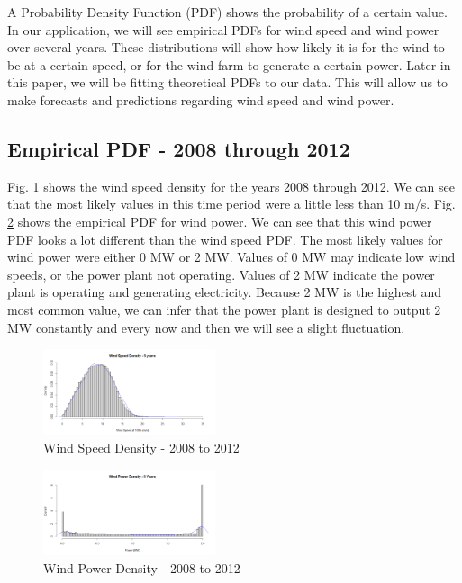 \documentclass{IEEEtran}
\begin{document}
  A Probability Density Function (PDF) shows the probability of a certain value. In our application, we will see empirical PDFs for wind speed and wind power over several years. These distributions will show how likely it is for the wind to be at a certain speed, or for the wind farm to generate a certain power. Later in this paper, we will be fitting theoretical PDFs to our data. This will allow us to make forecasts and predictions regarding wind speed and wind power.

  \subsection{Empirical PDF - 2008 through 2012}

  Fig. \ref{fig:dist1} shows the wind speed density for the years 2008 through 2012. We can see that the most likely values in this time period were a little less than 10 m/s. Fig. \ref{fig:pwr1} shows the empirical PDF for wind power. We can see that this wind power PDF looks a lot different than the wind speed PDF. The most likely values for wind power were either 0 MW or 2 MW. Values of 0 MW may indicate low wind speeds, or the power plant not operating. Values of 2 MW indicate the power plant is operating and generating electricity. Because 2 MW is the highest and most common value, we can infer that the power plant is designed to output 2 MW constantly and every now and then we will see a slight fluctuation.

  \begin{figure}[hbt!]
    \centering
    \includegraphics[width=0.45\textwidth]{figures/speeddensity5years}
    \caption{Wind Speed Density - 2008 to 2012}
    \label{fig:dist1}
  \end{figure}

  \begin{figure}
    \centering
    \includegraphics[width=0.45\textwidth]{figures/powerdensity5years}
    \caption{Wind Power Density - 2008 to 2012}
    \label{fig:pwr1}
  \end{figure}
\end{document}
